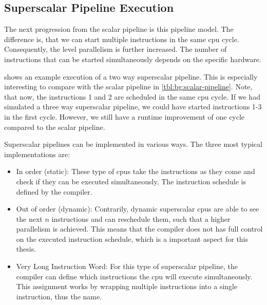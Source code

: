 \subsection{Superscalar Pipeline Execution}
The next progression from the scalar pipeline is this pipeline model.
The difference is, that we can start multiple instructions in the same \ac{cpu} cycle.
Consequently, the level parallelism is further increased.
The number of instructions that can be started simultaneously depends on the specific hardware. %

 shows an example execution of a two way superscalar pipeline.
This is especially interesting to compare with the scalar pipeline in \cref{tbl:bg:scalar-pipeline}.
Note, that now, the instructions 1 and 2 are scheduled in the same \ac{cpu} cycle.
If we had simulated a three way superscalar pipeline, we could have started instructions 1-3 in the first cycle.
However, we still have a runtime improvement of one cycle compared to the scalar pipeline.

Superscalar pipelines can be implemented in various ways.
The three most typical implementations are:
\begin{itemize}
    \item In order (static): 
        These type of \acp{cpu} take the instructions as they come and check if they can be executed simultaneously.
        The instruction schedule is defined by the compiler.
    \item Out of order (dynamic): 
        Contrarily, dynamic superscalar \acp{cpu} are able to see the next $n$ instructions and can reschedule them, such that a higher parallelism is achieved.
        This means that the compiler does not has full control on the executed instruction schedule, which is a important aspect for this thesis.
    \item Very Long Instruction Word: 
        For this type of superscalar pipeline, the compiler can define which instructions the \ac{cpu} will execute simultaneously.
        This assignment works by wrapping multiple instructions into a single instruction, thus the name.
\end{itemize}

